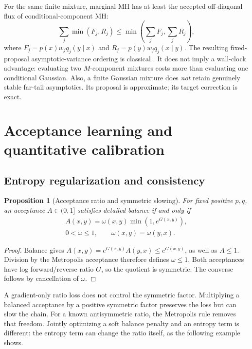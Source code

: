 \documentclass[pdflatex,iicol,sn-mathphys-ay]{sn-jnl}
\newtheorem{proposition}[theorem]{Proposition}
\theoremstyle{definition}\newtheorem{definition}[theorem]{Definition}
\theoremstyle{remark}\newtheorem{remark}[theorem]{Remark}
\numberwithin{equation}{section}
\newcommand{\1}{\mathbf 1}
\begin{document}
For the same finite mixture, marginal MH has at least the accepted off-diagonal flux of conditional-component MH:
\begin{equation}
\sum_j\min(F_j,R_j)\le\min\left(\sum_jF_j,\sum_jR_j\right),\label{eq:peskun}
\end{equation}
where $F_j=p(x)w_jq_j(y\mid x)$ and $R_j=p(y)w_jq_j(x\mid y)$. The resulting fixed-proposal asymptotic-variance ordering is classical \citep{tierney}. It does not imply a wall-clock advantage: evaluating two $M$-component mixtures costs more than evaluating one conditional Gaussian. Also, a finite Gaussian mixture does \emph{not} retain genuinely stable far-tail asymptotics. Its proposal is approximate; its target correction is exact.


\section{Acceptance learning and quantitative calibration}\label{sec:learning}
\subsection{Entropy regularization and consistency}

\begin{proposition}[Acceptance ratio and symmetric slowing]\label{prop:slowing}
For fixed positive $p,q$, an acceptance $A\in(0,1]$ satisfies detailed balance if and only if
\[
\begin{gathered}
A(x,y)=\omega(x,y)\min(1,e^{G(x,y)}),\\
0<\omega\le1,\qquad \omega(x,y)=\omega(y,x).
\end{gathered}
\]
\end{proposition}
\begin{proof}
Balance gives $A(x,y)=e^{G(x,y)}A(y,x)\le e^{G(x,y)}$, as well as $A\le1$. Division by the Metropolis acceptance therefore defines $\omega\le1$. Both acceptances have log forward/reverse ratio $G$, so the quotient is symmetric. The converse follows by cancellation of $\omega$.
\end{proof}
A gradient-only ratio loss does not control the symmetric factor. Multiplying a balanced acceptance by a positive symmetric factor preserves the loss but can slow the chain. For a known antisymmetric ratio, the Metropolis rule removes that freedom. Jointly optimizing a soft balance penalty and an entropy term is different: the entropy term can change the ratio itself, as the following example shows.
\end{document}
